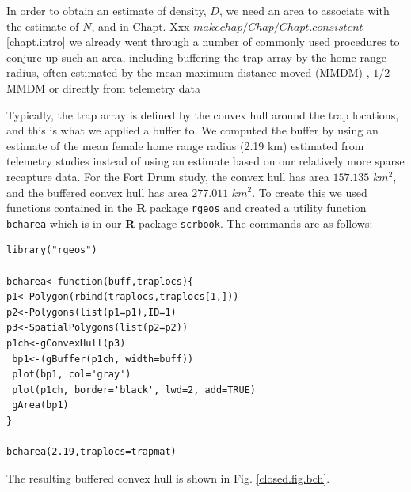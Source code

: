 In order to obtain an estimate of density, $D$, we need an area to
associate with the estimate of $N$,  and in Chapt. Xxx $make chap/Chap/Chapt. consistent$ \ref{chapt.intro} we already 
went through a number of commonly used procedures to
conjure up such an area, including buffering the trap array by the home
range radius, often estimated by the mean maximum distance moved
(MMDM) \citep{parmenter_etal:2003},
$1/2$ MMDM \citep{dice:1938} or
directly from telemetry data \citep{wallace_etal:2003}

Typically, the trap
array is defined by the convex hull around the trap locations, and
this is what we applied a buffer to. We computed the buffer by using
an estimate of the mean female home range radius (2.19 km) estimated from
telemetry studies \citep{bales_etal:2005} instead of using an estimate
based on our relatively more sparse recapture data.
 For the Fort Drum study, the convex hull has area
$157.135$ $km^2$, and the buffered convex hull has area $277.011$
$km^2$.
To create this we used functions contained in the {\bf R} package
\mbox{\tt rgeos} and created a utility function \mbox{\tt bcharea}
which is in our {\bf R} package \mbox{\tt scrbook}. The commands are
as follows:
\begin{verbatim}
library("rgeos")

bcharea<-function(buff,traplocs){
p1<-Polygon(rbind(traplocs,traplocs[1,]))
p2<-Polygons(list(p1=p1),ID=1)
p3<-SpatialPolygons(list(p2=p2))
p1ch<-gConvexHull(p3)
 bp1<-(gBuffer(p1ch, width=buff))
 plot(bp1, col='gray')
 plot(p1ch, border='black', lwd=2, add=TRUE)
 gArea(bp1)
}

bcharea(2.19,traplocs=trapmat)
\end{verbatim}
The resulting buffered convex hull is shown in Fig. \ref{closed.fig.bch}.
